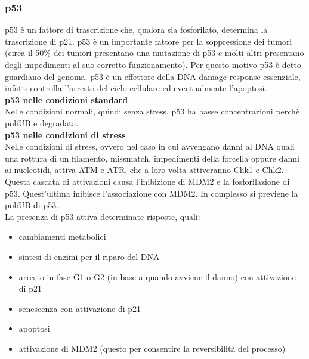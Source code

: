         \subsubsection{p53}
            p53 è un fattore di trascrizione che, qualora sia fosforilato, determina la trascrizione di p21. p53 è un importante fattore per la soppressione dei tumori (circa il 50\% dei tumori presentano una mutazione di p53 e molti altri presentano degli impedimenti al suo corretto funzionamento).
            Per questo motivo p53 è detto guardiano del genoma. p53 è un effettore della DNA damage response essenziale, infatti controlla l'arresto del ciclo cellulare ed eventualmente l'apoptosi.\\
            
            \textbf{p53 nelle condizioni standard}\\
                Nelle condizioni normali, quindi senza stress, p53 ha basse concentrazioni perchè poliUB e degradata.\\
            
            \textbf{p53 nelle condizioni di stress}\\
                Nelle condizioni di stress, ovvero nel caso in cui avvengano danni al DNA quali una rottura di un filamento, missmatch, impedimenti della forcella oppure danni ai nucleotidi, attiva ATM e ATR, che a loro volta attiveranno Chk1 e Chk2.
                Questa cascata di attivazioni causa l'inibizione di MDM2 e la fosforilazione di p53. Quest'ultima inibisce l'associazione con MDM2. In complesso si previene la poliUB di p53.\\
                La presenza di p53 attiva determinate risposte, quali:
                \begin{itemize}
                    \item cambiamenti metabolici
                    \item sintesi di enzimi per il riparo del DNA
                    \item arresto in fase G1 o G2 (in base a quando avviene il danno) con attivazione di p21
                    \item senescenza con attivazione di p21
                    \item apoptosi
                    \item attivazione di MDM2 (questo per consentire la reversibilità del processo)
                \end{itemize}
                
